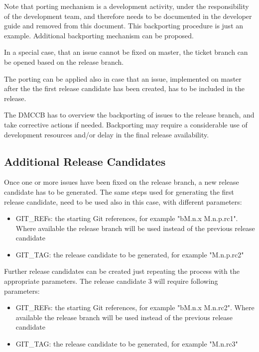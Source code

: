 Note that porting mechanism is a development activity, under the responsibility of the development team, and therefore needs to be documented in the developer guide and removed from this document.
This backporting procedure is just an example. Additional backporting mechanism can be proposed.

In a special case, that an issue cannot be fixed on master, the ticket branch can be opened based on the release branch.

The porting can be applied also in case that an issue, implemented on master after the the first release candidate has been created, has to be included in the release.

The DMCCB has to overview the backporting of issues to the release branch, and take corrective actions if needed. Backporting may require a considerable use of development resources and/or delay in the final release availability.


\subsection{Additional Release Candidates} \label{sec:newrc}

Once one or more issues have been fixed on the release branch, a new release candidate has to be generated. %
The same steps used for generating the first release candidate, need to be used also in this case, with different parameters:

\begin{itemize}
\item GIT\_REFs: the starting Git references, for example "bM.n.x M.n.p.rc1". Where available the release branch will be used instead of the previous release candidate
\item GIT\_TAG: the release candidate to be generated, for example "M.n.p.rc2"
\end{itemize}

Further release candidates can be created just repeating the process with the appropriate parameters.
The release candidate 3 will require following parameters:

\begin{itemize}
\item GIT\_REFs: the starting Git references, for example "bM.n.x M.n.rc2". Where available the release branch will be used instead of the previous release candidate
\item GIT\_TAG: the release candidate to be generated, for example "M.n.rc3"
\end{itemize}

